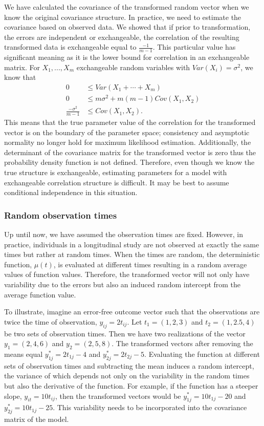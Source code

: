 \documentclass[12pt]{article}
\begin{document}
We have calculated the covariance of the transformed random vector when we know the original covariance structure. In practice, we need to estimate the covariance based on observed data. We showed that if prior to transformation, the errors are independent or exchangeable, the correlation of the resulting transformed data is exchangeable equal to $\frac{-1}{m-1}$. This particular value has significant meaning as it is the lower bound for correlation in an exchangeable matrix. For $X_{1},...,X_{m}$ exchangeable random variables with $Var(X_{i})=\sigma^{2}$, we know that
\begin{align*}
0&\leq Var(X_{1}+\cdots +X_{m})\\
0&\leq m\sigma^{2}+m(m-1)Cov(X_{1},X_{2})\\
\frac{-\sigma^{2}}{m-1}&\leq Cov(X_{1},X_{2}).
\end{align*}
This means that the true parameter value of the correlation for the transformed vector is on the boundary of the parameter space; consistency and asymptotic normality no longer hold for maximum likelihood estimation. Additionally, the determinant of the covariance matrix for the transformed vector is zero thus the probability density function is not defined. Therefore, even though we know the true structure is exchangeable, estimating parameters for a model with exchangeable correlation structure is difficult. It may be best to assume conditional independence in this situation. 
 
\subsubsection{Random observation times} 
Up until now, we have assumed the observation times are fixed. However, in practice, individuals in a longitudinal study are not observed at exactly the same times but rather at random times. When the times are random, the deterministic function, $\mu(t)$, is evaluated at different times resulting in a random average values of function values. Therefore, the transformed vector will not only have variability due to the errors but also an induced random intercept from the average function value. 

To illustrate, imagine an error-free outcome vector such that the observations are twice the time of observation, $y_{ij}=2t_{ij}$. Let $t_{1}=(1,2,3)$ and $t_{2}=(1,2.5,4)$ be two sets of observation times. Then we have two realizations of the vector $y_{1}=(2,4,6)$ and $y_{2}=(2,5,8)$. The transformed vectors after removing the means equal $y^{*}_{1j}=2t_{1j}-4$ and  $y^{*}_{2j}=2t_{2j}-5$. Evaluating the function at different sets of observation times and subtracting the mean induces a random intercept, the variance of which depends not only on the variability in the random times but also the derivative of the function. For example, if the function has a steeper slope, $y_{it}=10t_{ij}$, then the transformed vectors would be $y^{*}_{1j} = 10t_{1j}-20$ and $y^{*}_{2j} = 10t_{1j}-25$. This variability needs to be incorporated into the covariance matrix of the model. 
\end{document}
